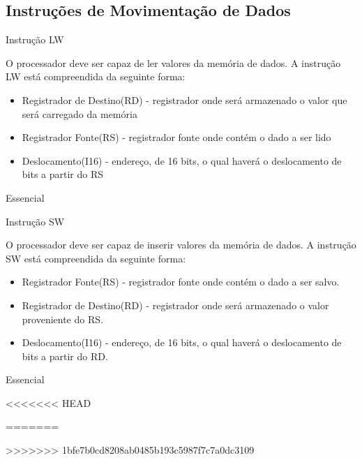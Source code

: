 \documentclass{article}
\begin{document}
  \subsection{Instruções de Movimentação de Dados}
    \begin{functional}
     \requirement
      {Instrução LW}
      {O processador deve ser capaz de ler valores da memória de dados.
       A instrução LW está compreendida da seguinte forma:
       \begin{itemize}
        \item Registrador de Destino(RD) - registrador onde será armazenado o valor que será carregado da memória
        \item Registrador Fonte(RS) - registrador fonte onde contém o dado a ser lido
        \item Deslocamento(I16) - endereço, de 16 bits, o qual haverá o deslocamento de bits a partir do RS
       \end{itemize}
      }
      {Essencial}

     \requirement
      {Instrução SW}
      {O processador deve ser capaz de inserir valores da memória de dados.
      A instrução SW está compreendida da seguinte forma:
       \begin{itemize}
        \item Registrador Fonte(RS) - registrador fonte onde contém o dado a ser salvo.
        \item Registrador de Destino(RD) - registrador onde será armazenado o valor proveniente do RS.
        \item Deslocamento(I16) - endereço, de 16 bits, o qual haverá o deslocamento de bits a partir do RD.
       \end{itemize}}
      {Essencial}
    \end{functional}
<<<<<<< HEAD
    
=======

>>>>>>> 1bfe7b0cd8208ab0485b193c5987f7c7a0dc3109
\end{document}

